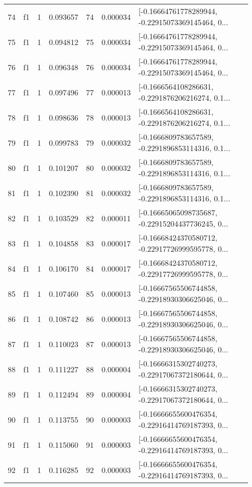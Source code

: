 \begin{tabular}{lllrlrl}
74  &  f1 &   1 &  0.093657 &   74 &  0.000034 &  [-0.16664761778289944, -0.22915073369145464, 0... \\
75  &  f1 &   1 &  0.094812 &   75 &  0.000034 &  [-0.16664761778289944, -0.22915073369145464, 0... \\
76  &  f1 &   1 &  0.096348 &   76 &  0.000034 &  [-0.16664761778289944, -0.22915073369145464, 0... \\
77  &  f1 &   1 &  0.097496 &   77 &  0.000013 &  [-0.1666564108286631, -0.2291876206216274, 0.1... \\
78  &  f1 &   1 &  0.098636 &   78 &  0.000013 &  [-0.1666564108286631, -0.2291876206216274, 0.1... \\
79  &  f1 &   1 &  0.099783 &   79 &  0.000032 &  [-0.1666809783657589, -0.2291896853114316, 0.1... \\
80  &  f1 &   1 &  0.101207 &   80 &  0.000032 &  [-0.1666809783657589, -0.2291896853114316, 0.1... \\
81  &  f1 &   1 &  0.102390 &   81 &  0.000032 &  [-0.1666809783657589, -0.2291896853114316, 0.1... \\
82  &  f1 &   1 &  0.103529 &   82 &  0.000011 &  [-0.16665065098735687, -0.22915204437736245, 0... \\
83  &  f1 &   1 &  0.104858 &   83 &  0.000017 &  [-0.16668424370580712, -0.22917726999595778, 0... \\
84  &  f1 &   1 &  0.106170 &   84 &  0.000017 &  [-0.16668424370580712, -0.22917726999595778, 0... \\
85  &  f1 &   1 &  0.107460 &   85 &  0.000013 &  [-0.16667565506744858, -0.22918930306625046, 0... \\
86  &  f1 &   1 &  0.108742 &   86 &  0.000013 &  [-0.16667565506744858, -0.22918930306625046, 0... \\
87  &  f1 &   1 &  0.110023 &   87 &  0.000013 &  [-0.16667565506744858, -0.22918930306625046, 0... \\
88  &  f1 &   1 &  0.111227 &   88 &  0.000004 &  [-0.16666315302740273, -0.22917067372180644, 0... \\
89  &  f1 &   1 &  0.112494 &   89 &  0.000004 &  [-0.16666315302740273, -0.22917067372180644, 0... \\
90  &  f1 &   1 &  0.113755 &   90 &  0.000003 &  [-0.16666655600476354, -0.22916414769187393, 0... \\
91  &  f1 &   1 &  0.115060 &   91 &  0.000003 &  [-0.16666655600476354, -0.22916414769187393, 0... \\
92  &  f1 &   1 &  0.116285 &   92 &  0.000003 &  [-0.16666655600476354, -0.22916414769187393, 0... \\

\end{tabular}
